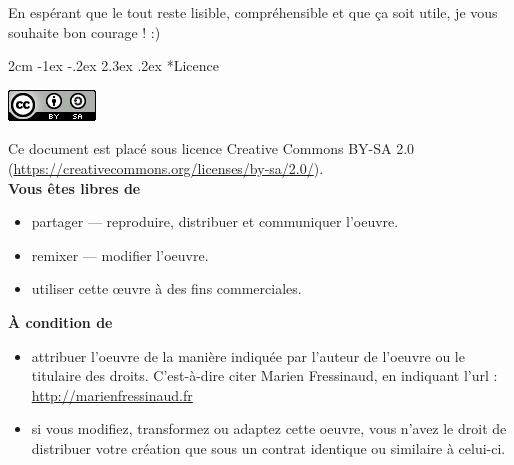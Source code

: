 \documentclass[a4paper,11pt]{article}
\makeatletter
\renewcommand\section{\@startsection{section}{1}{\z@}%
	{2cm \@plus -1ex \@minus -.2ex}%
	{2.3ex \@plus.2ex}%
	{\color{bleuClair}\reset@font\Large\bfseries}}
\makeatother
\begin{document}
En espérant que le tout reste lisible, compréhensible et que ça soit utile, je vous souhaite bon courage ! :)

\newpage
\section*{Licence}
  \begin{center}
    \includegraphics{ccby-sa.png}\\
  \end{center}
  Ce document est placé sous licence Creative Commons BY-SA 2.0 (\url{https://creativecommons.org/licenses/by-sa/2.0/}).\\
  \textbf{Vous êtes libres de}
  \begin{itemize}
    \item partager — reproduire, distribuer et communiquer l'oeuvre.
    \item remixer — modifier l'oeuvre.
    \item utiliser cette œuvre à des fins commerciales.
  \end{itemize}
  \textbf{À condition de}
  \begin{itemize}
    \item attribuer l'oeuvre de la manière indiquée par l'auteur de l'oeuvre ou le titulaire des droits. C'est-à-dire citer Marien Fressinaud, en indiquant l'url : \url{http://marienfressinaud.fr}
    \item si vous modifiez, transformez ou adaptez cette oeuvre, vous n'avez le droit de distribuer votre création que sous un contrat identique ou similaire à celui-ci.
  \end{itemize}
\end{document}
